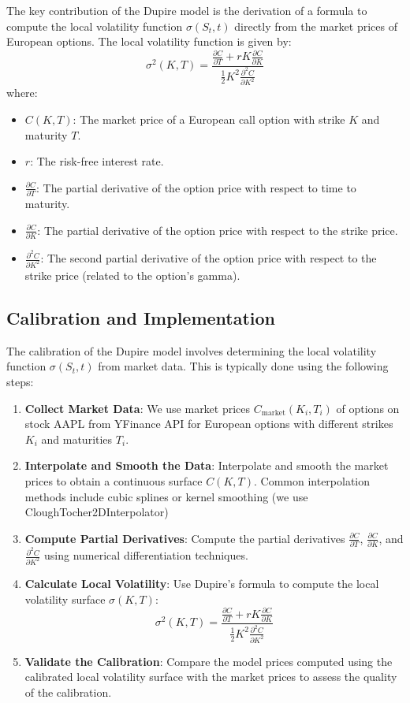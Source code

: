 \documentclass[11pt, oneside, a4paper, titlepage]{report}
\begin{document}
The key contribution of the Dupire model is the derivation of a formula to compute the local volatility function \( \sigma(S_t, t) \) directly from the market prices of European options. The local volatility function is given by:
\[
\sigma^2(K, T) = \frac{\frac{\partial C}{\partial T} + r K \frac{\partial C}{\partial K}}{\frac{1}{2} K^2 \frac{\partial^2 C}{\partial K^2}}
\]
where:
\begin{itemize}
    \item \( C(K, T) \): The market price of a European call option with strike \( K \) and maturity \( T \).
    \item \( r \): The risk-free interest rate.
    \item \( \frac{\partial C}{\partial T} \): The partial derivative of the option price with respect to time to maturity.
    \item \( \frac{\partial C}{\partial K} \): The partial derivative of the option price with respect to the strike price.
    \item \( \frac{\partial^2 C}{\partial K^2} \): The second partial derivative of the option price with respect to the strike price (related to the option's gamma).
\end{itemize}

\subsection{Calibration and Implementation}

The calibration of the Dupire model involves determining the local volatility function \( \sigma(S_t, t) \) from market data. This is typically done using the following steps:
\begin{enumerate}
    \item \textbf{Collect Market Data}:
    We use market prices \( C_{\text{market}}(K_i, T_i) \) of options on stock AAPL from YFinance API for European options with different strikes \( K_i \) and maturities \( T_i \).

    \item \textbf{Interpolate and Smooth the Data}:
    Interpolate and smooth the market prices to obtain a continuous surface \( C(K, T) \). Common interpolation methods include cubic splines or kernel smoothing (we use CloughTocher2DInterpolator)
    \item \textbf{Compute Partial Derivatives}:
    Compute the partial derivatives \( \frac{\partial C}{\partial T} \), \( \frac{\partial C}{\partial K} \), and \( \frac{\partial^2 C}{\partial K^2} \) using numerical differentiation techniques.
    \item \textbf{Calculate Local Volatility}:
    Use Dupire's formula to compute the local volatility surface \( \sigma(K, T) \):
    \[
    \sigma^2(K, T) = \frac{\frac{\partial C}{\partial T} + r K \frac{\partial C}{\partial K}}{\frac{1}{2} K^2 \frac{\partial^2 C}{\partial K^2}}
    \]
    \item \textbf{Validate the Calibration}:
    Compare the model prices computed using the calibrated local volatility surface with the market prices to assess the quality of the calibration.
\end{enumerate}
\end{document}
